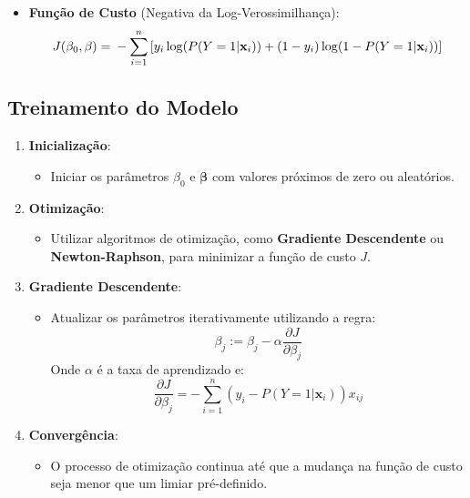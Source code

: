 \documentclass{sciposter}
\begin{document}
\begin{multicols}{3}
\begin{itemize}
    \item \textbf{Função de Custo} (Negativa da Log-Verossimilhança):
    \[
    J(\beta_0, \mathbf{\beta}) = \\
    
    - \sum_{i=1}^{n} \left[ y_i \log(P(Y=1|\mathbf{x}_i)) + (1 - y_i) \log(1 - P(Y=1|\mathbf{x}_i)) \right]
    \]
\end{itemize}

\subsection{Treinamento do Modelo}

\begin{enumerate}
    \item \textbf{Inicialização}:
    \begin{itemize}
        \item Iniciar os parâmetros $\beta_0$ e $\mathbf{\beta}$ com valores próximos de zero ou aleatórios.
    \end{itemize}
    
    \item \textbf{Otimização}:
    \begin{itemize}
        \item Utilizar algoritmos de otimização, como \textbf{Gradiente Descendente} ou \textbf{Newton-Raphson}, para minimizar a função de custo $J$.
    \end{itemize}
    
    \item \textbf{Gradiente Descendente}:
    \begin{itemize}
        \item Atualizar os parâmetros iterativamente utilizando a regra:
        \[
        \beta_j := \beta_j - \alpha \frac{\partial J}{\partial \beta_j}
        \]
        Onde $\alpha$ é a taxa de aprendizado e:
        \[
        \frac{\partial J}{\partial \beta_j} = - \sum_{i=1}^{n} (y_i - P(Y=1|\mathbf{x}_i)) x_{ij}
        \]
    \end{itemize}
    
    \item \textbf{Convergência}:
    \begin{itemize}
        \item O processo de otimização continua até que a mudança na função de custo seja menor que um limiar pré-definido.
    \end{itemize}
\end{enumerate}


\end{multicols}
\end{document}
